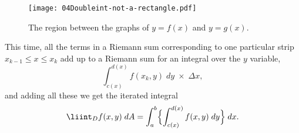 \begin{figure}[htb]
  \texttt{[image: 04Doubleint-not-a-rectangle.pdf]}
  \caption{The region between the graphs of $y=f(x)$ and $y=g(x)$.}
  \label{fig:04Doubleint-not-a-rectangle}
\end{figure}

This time, all the terms in a Riemann sum corresponding to one
particular strip $x_{k-1} \le x\le x_k$ add up to a Riemann sum for an
integral over the $y$ variable,
\[
\int_{c(x)}^{d(x)} f(x_k, y)\; dy \; \times \;  \Delta x,
\]
and adding all these we get the iterated integral
\begin{equation}
  \liint_{D} f(x, y) \;  dA 
  = \int_a^b \Bigl\{\int_{c(x)}^{d(x)} f(x, y) \; dy\Bigr\} \; dx.
  \label{eq:04Doubleint-between-two-graphs}
\end{equation}

